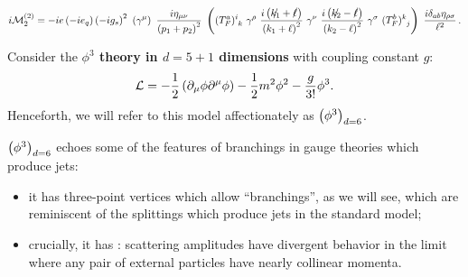 \begin{align}
    i \mathcal{M}_2^{(2)}
    =
    -i e
    \le(-i e_q\ri)
    \le(-i g_s\ri)^2
    \,\,
    \le(
    \gamma^\mu
    \ri)
    \,\,
    \frac{i \eta_{\mu\nu}}{\le(p_1 + p_2\ri)^2}
    \,\,
    \le(
        (T_F^a)\indices{^i_k}
        \,\,
        \gamma^\rho
        \,\,
        \frac{i \le(\slashed{k_1} + \slashed{\ell}\ri)}
            {\le(k_1 + \ell\ri)^2}
        \,\,
        \gamma^\nu
        \,\,
        \frac{i \le(\slashed{k_2} - \slashed{\ell}\ri)}
            {\le(k_2 - \ell\ri)^2}
        \,\,
        \gamma^\sigma
        \,\,
        (T_F^b)\indices{^k_j}
    \ri)
    \,\,
    \frac{i \delta_{ab} \eta_{\rho\sigma}}{\ell^2}
    \,.
\end{align}






\fi


\newcommand{\phicubedsix}{\ensuremath{\le(\phi^3\ri)_{d=6}}}


Consider the \textbf{\(\phi^3\) theory in \(d=5+1\) dimensions} with coupling constant \(g\):
\begin{align}
    \mathcal{L}
    =
    -\frac{1}{2}\left(\partial_\mu \phi \partial^\mu \phi\right)
    -
    \frac{1}{2}m^2 \phi^2
    -
    \frac{g}{3!}\phi^3
    .
\end{align}
Henceforth, we will refer to this model affectionately as \phicubedsix.

\phicubedsix{} echoes some of the features of branchings in gauge theories which produce jets:
\begin{itemize}
    \item
    it has three-point vertices which allow ``branchings'', as we will see, which are reminiscent of the splittings which produce jets in the standard model;

    \item
    crucially, it has :
    scattering amplitudes have divergent behavior in the limit where any pair of external particles have nearly collinear momenta.
\end{itemize}


